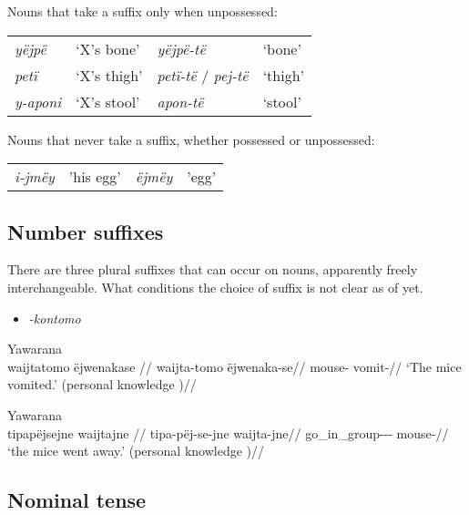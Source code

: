 \documentclass{memoir}
\begin{document}
\ex\label{suffunpossessed} Nouns that take a suffix only when
unpossessed:

\begin{tabular}[t]{llll}

  \emph{yëjpë} &  ‘X’s bone’ &                \emph{yëjpë-të} &  ‘bone’ \\

   \emph{petï} & ‘X’s thigh’ & \emph{petï-të} / \emph{pej-të} & ‘thigh’ \\
\emph{y-aponi} & ‘X’s stool’ &                 \emph{apon-të} & ‘stool’ \\

\end{tabular}
 \xe

\ex\label{unsuffixednouns} Nouns that never take a suffix, whether
possessed or unpossessed:

\begin{tabular}[t]{llll}

\emph{i-jmëy} & 'his egg’ & \emph{ëjmëy} & 'egg’ \\

\end{tabular}
 \xe

\subsection{\texorpdfstring{Number suffixes
\label{sec:nominalnumber}}{Number suffixes }}

There are three plural suffixes that can occur on nouns, apparently
freely interchangeable. What conditions the choice of suffix is not
clear as of yet.

\begin{itemize}
\tightlist
\item
  \emph{-kontomo}
\end{itemize}

\ex  Yawarana  \\\label{ctorat-17}
\begingl \glpreamble waijtatomo ëjwenakase //
\gla waijta-tomo ëjwenaka-se//
\glb mouse- vomit-//
\glft ‘The mice vomited.’ (personal knowledge
)//
\endgl
\xe

\ex  Yawarana  \\\label{ctorat-40}
\begingl \glpreamble tipapëjsejne waijtajne //
\gla tipa-pëj-se-jne waijta-jne//
\glb go\_in\_group--- mouse-//
\glft ‘the mice went away.’ (personal knowledge
)//
\endgl
\xe

\subsection{\texorpdfstring{Nominal tense
\label{sec:nominaltense}}{Nominal tense }}
\end{document}
